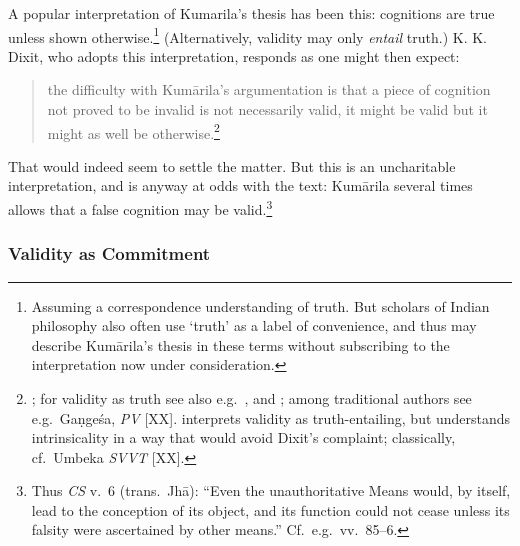 \documentclass[11pt,letterpaper,oneside]{amsart}
\newcommand{\e}{\emph}
\newenvironment{squote}{\begin{quote}\sf\small}{\rm\end{quote}} %
\begin{document}
A popular interpretation of Kumarila's thesis has been this: cognitions are true unless shown otherwise.\footnote{Assuming a correspondence understanding of truth. But scholars of Indian philosophy also often use `truth' as a label of convenience, and thus may describe Kum\=arila's thesis in these terms without subscribing to the interpretation now under consideration.}  (Alternatively, validity may only \emph{entail} truth.) K. K. Dixit, who adopts this interpretation, responds as one might then expect:\begin{squote}the difficulty with Kum\=arila's argumentation is that a piece of cognition not proved to be invalid is not necessarily valid, it might be valid but it might as well be otherwise.\footnote{\citet[p.\ 5]{dixit1983slokavarttika}; for validity as truth see also e.g.\ \citet{chatterjea2003svatah}, and \citet{hiriyanna1932outlines}; among traditional authors see e.g.\ Ga\d nge\'sa, \emph{PV} [XX]. \citet{bhatt1962epistemology} interprets validity as truth-entailing, but understands intrinsicality in a way that would avoid Dixit's complaint; classically, cf.\ Umbeka \emph{SVVT} [XX].} \end{squote} That would indeed seem to settle the matter. But this is an uncharitable interpretation, and is anyway at odds with the text: Kum\=arila several times allows that a false cognition may be valid.\footnote{Thus \e{CS} v.\ 6 (trans.\ Jh\=a): ``Even the unauthoritative Means would, by itself, lead to the conception of its object, and its function could not cease unless its falsity were ascertained by other means.'' Cf.\ e.g.\ vv.\ 85--6.}

\subsubsection*{Validity as Commitment}
\end{document}
